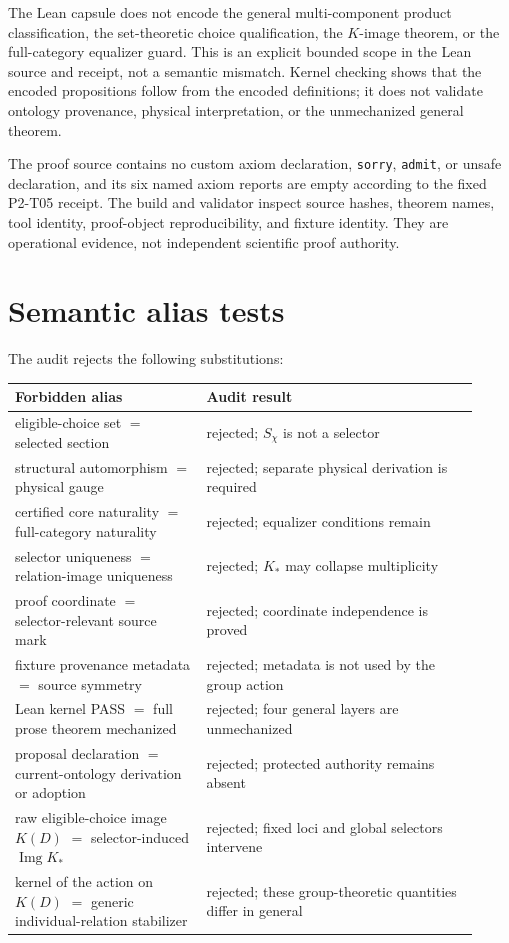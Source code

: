 \documentclass[11pt]{article}
\newcommand{\Sch}{S_{\chi}}
\begin{document}
The Lean capsule does not encode the general multi-component product
classification, the set-theoretic choice qualification, the \(K\)-image
theorem, or the full-category equalizer guard.  This is an explicit bounded
scope in the Lean source and receipt, not a semantic mismatch.  Kernel checking
shows that the encoded propositions follow from the encoded definitions; it
does not validate ontology provenance, physical interpretation, or the
unmechanized general theorem.

The proof source contains no custom axiom declaration, \texttt{sorry},
\texttt{admit}, or unsafe declaration, and its six named axiom reports are
empty according to the fixed P2-T05 receipt.  The build and validator inspect
source hashes, theorem names, tool identity, proof-object reproducibility, and
fixture identity.  They are operational evidence, not independent scientific
proof authority.

\section{Semantic alias tests}

The audit rejects the following substitutions:

\begin{longtable}{p{0.38\linewidth}p{0.54\linewidth}}
\toprule
Forbidden alias & Audit result \\
\midrule
eligible-choice set \(=\) selected section & rejected; \(\Sch\) is not a selector \\
structural automorphism \(=\) physical gauge & rejected; separate physical derivation is required \\
certified core naturality \(=\) full-category naturality & rejected; equalizer conditions remain \\
selector uniqueness \(=\) relation-image uniqueness & rejected; \(K_*\) may collapse multiplicity \\
proof coordinate \(=\) selector-relevant source mark & rejected; coordinate independence is proved \\
fixture provenance metadata \(=\) source symmetry & rejected; metadata is not used by the group action \\
Lean kernel PASS \(=\) full prose theorem mechanized & rejected; four general layers are unmechanized \\
proposal declaration \(=\) current-ontology derivation or adoption & rejected; protected authority remains absent \\
raw eligible-choice image \(K(D)\) \(=\) selector-induced \(\operatorname{Img}K_*\) & rejected; fixed loci and global selectors intervene \\
kernel of the action on \(K(D)\) \(=\) generic individual-relation stabilizer & rejected; these group-theoretic quantities differ in general \\
\bottomrule
\end{longtable}
\end{document}
